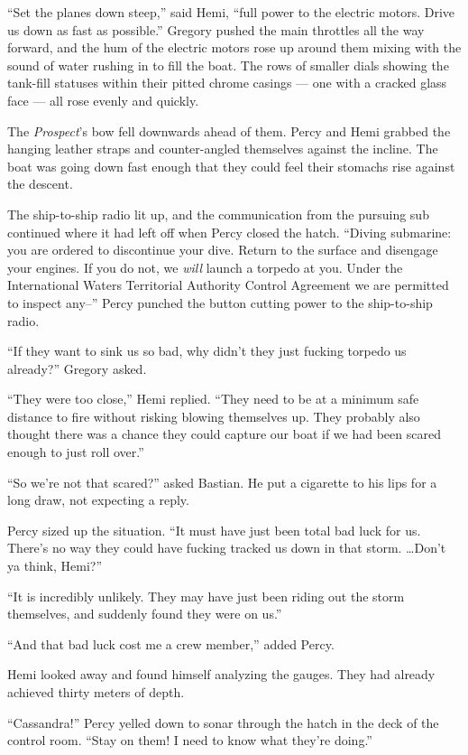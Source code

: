 \documentclass[
]{scrbook}
\begin{document}
``Set the planes down steep,'' said Hemi, ``full power to the electric
motors. Drive us down as fast as possible.'' Gregory pushed the main
throttles all the way forward, and the hum of the electric motors rose
up around them mixing with the sound of water rushing in to fill the
boat. The rows of smaller dials showing the tank-fill statuses within
their pitted chrome casings --- one with a cracked glass face --- all
rose evenly and quickly.

The \emph{Prospect}'s bow fell downwards ahead of them. Percy and Hemi
grabbed the hanging leather straps and counter-angled themselves against
the incline. The boat was going down fast enough that they could feel
their stomachs rise against the descent.

The ship-to-ship radio lit up, and the communication from the pursuing
sub continued where it had left off when Percy closed the hatch.
``Diving submarine: you are ordered to discontinue your dive. Return to
the surface and disengage your engines. If you do not, we \emph{will}
launch a torpedo at you. Under the International Waters Territorial
Authority Control Agreement we are permitted to inspect any--'' Percy
punched the button cutting power to the ship-to-ship radio.

``If they want to sink us so bad, why didn't they just fucking torpedo
us already?'' Gregory asked.

``They were too close,'' Hemi replied. ``They need to be at a minimum
safe distance to fire without risking blowing themselves up. They
probably also thought there was a chance they could capture our boat if
we had been scared enough to just roll over.''

``So we're not that scared?'' asked Bastian. He put a cigarette to his
lips for a long draw, not expecting a reply.

Percy sized up the situation. ``It must have just been total bad luck
for us. There's no way they could have fucking tracked us down in that
storm. \ldots Don't ya think, Hemi?''

``It is incredibly unlikely. They may have just been riding out the
storm themselves, and suddenly found they were on us.''

``And that bad luck cost me a crew member,'' added Percy.

Hemi looked away and found himself analyzing the gauges. They had
already achieved thirty meters of depth.

``Cassandra!'' Percy yelled down to sonar through the hatch in the deck
of the control room. ``Stay on them! I need to know what they're
doing.''
\end{document}
